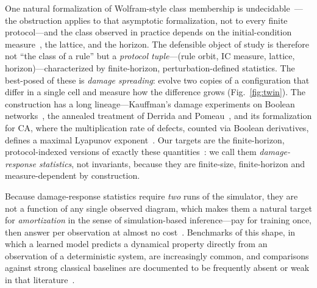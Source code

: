 \documentclass[aip,cha,amsmath,amssymb,reprint,floatfix]{revtex4-2}
\begin{document}
One natural formalization of Wolfram-style class membership is
undecidable~\cite{culikyu1988}---the obstruction applies to that asymptotic
formalization, not to every finite protocol---and the class observed in
practice depends on the initial-condition measure~\cite{gilman1987}, the
lattice, and the horizon. The defensible object
of study is therefore not ``the class of a rule'' but a \emph{protocol
tuple}---(rule orbit, IC measure, lattice, horizon)---characterized by
finite-horizon, perturbation-defined statistics. The best-posed of these is
\emph{damage spreading}: evolve two copies of a configuration that differ in a
single cell and measure how the difference grows (Fig.~\ref{fig:twin}). The construction has a long
lineage---Kauffman's damage experiments on Boolean
networks~\cite{kauffman1969}, the annealed treatment of Derrida and
Pomeau~\cite{derridapomeau1986}, and its formalization for CA, where the
multiplication rate of defects, counted via Boolean derivatives, defines a
maximal Lyapunov exponent~\cite{bagnoli1992,baetens2010}. Our targets are the finite-horizon,
protocol-indexed versions of exactly these
quantities~\cite{vispoel2024damage,vispoel2022progress}: we call them
\emph{damage-response statistics}, not invariants, because they are
finite-size, finite-horizon and measure-dependent by construction.

Because damage-response statistics require \emph{two} runs of the simulator,
they are not a function of any single observed diagram, which makes them a
natural target for \emph{amortization} in the sense of simulation-based
inference---pay for training once, then answer per observation at almost no
cost~\cite{cranmer2020}. Benchmarks of this shape, in which a learned model
predicts a dynamical property directly from an observation of a
deterministic system, are increasingly common, and comparisons against
strong classical baselines are documented to be frequently absent or weak in
that literature~\cite{mcgreivy2024}.
\end{document}
